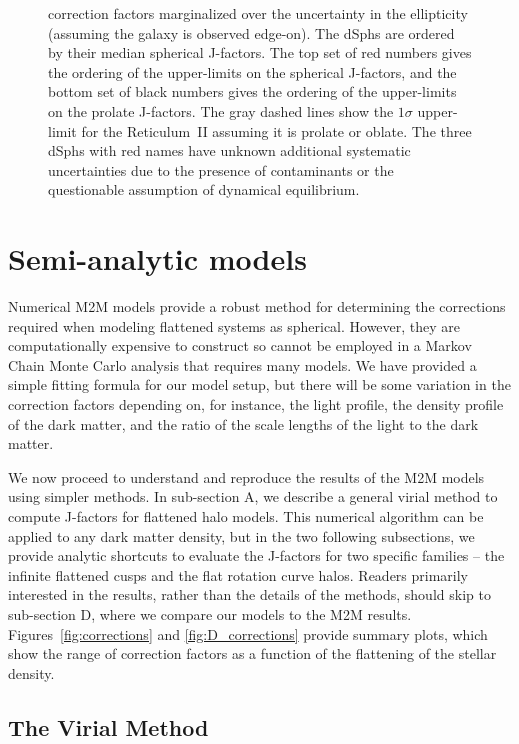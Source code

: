 \documentclass[prd,twocolumn,showpacs,preprintnumbers,superscriptaddress,nofootinbib,amsmath,amssymb,nobalancelastpage]{revtex4}
\begin{document}
\begin{figure}
{  correction factors marginalized over the uncertainty in the
  ellipticity (assuming the galaxy is observed edge-on). The dSphs
  are ordered by their median spherical J-factors. The top set of red
  numbers gives the ordering of the upper-limits on the spherical
  J-factors, and the bottom set of black numbers gives the ordering of
  the upper-limits on the prolate J-factors. The gray dashed lines
  show the $1\sigma$ upper-limit for the Reticulum~II assuming it is
  prolate or oblate. The three dSphs with red names have unknown additional systematic uncertainties due to the presence of contaminants or the questionable assumption of dynamical equilibrium.}
\label{fig:KF_corrections}
\end{figure}

\section{Semi-analytic models}
\label{sec:AnalyticModels}

Numerical M2M models provide a robust method for determining the
corrections required when modeling flattened systems as
spherical. However, they are computationally expensive to construct so
cannot be employed in a Markov Chain Monte Carlo analysis that
requires many models. We have provided a simple fitting formula for
our model setup, but there will be some variation in the correction
factors depending on, for instance, the light profile,
the density profile of the dark matter, and the ratio of the scale lengths
of the light to the dark matter.

We now proceed to understand and reproduce the results of the M2M
models using simpler methods. In sub-section A, we describe a general
virial method to compute J-factors for flattened halo models. This
numerical algorithm can be applied to any dark matter density, but in
the two following subsections, we provide analytic shortcuts to
evaluate the J-factors for two specific families -- the infinite
flattened cusps and the flat rotation curve halos.  Readers primarily
interested in the results, rather than the details of the methods,
should skip to sub-section D, where we compare our models to the M2M
results. Figures~\ref{fig:corrections} and
\ref{fig:D_corrections} provide summary plots, which show the range of
correction factors as a function of the flattening of the stellar
density.

\subsection{The Virial Method}\label{VirMethod}
\end{document}
